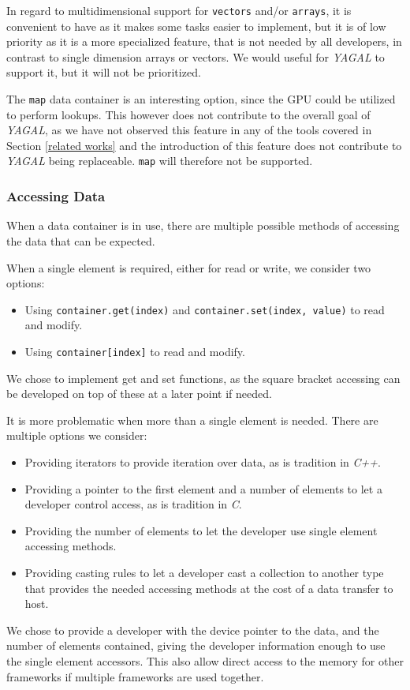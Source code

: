 In regard to multidimensional support for \texttt{vectors} and/or \texttt{arrays}, it is convenient to have as it makes some tasks easier to implement, but it is of low priority as it is a more specialized feature, that is not needed by all developers, in contrast to single dimension arrays or vectors. We would useful for \textit{YAGAL} to support it, but it will not be prioritized.

The \texttt{map} data container is an interesting option, since the GPU could be utilized to perform lookups. This however does not contribute to the overall goal of \textit{YAGAL}, as we have not observed this feature in any of the tools covered in Section \ref{related works} and the introduction of this feature does not contribute to \textit{YAGAL} being replaceable. \texttt{map} will therefore not be supported.

\subsubsection{Accessing Data}
When a data container is in use, there are multiple possible methods of accessing the data that can be expected. 

When a single element is required, either for read or write, we consider two options:
\begin{itemize}
\item Using \texttt{container.get(index)} and \texttt{container.set(index, value)} to read and modify.
\item Using \texttt{container[index]} to read and modify.
\end{itemize}
We chose to implement get and set functions, as the square bracket accessing can be developed on top of these at a later point if needed.

It is more problematic when more than a single element is needed. There are multiple options we consider:
\begin{itemize}
\item Providing iterators to provide iteration over data, as is tradition in \textit{C++}.
\item Providing a pointer to the first element and a number of elements to let a developer control access, as is tradition in \textit{C}.
\item Providing the number of elements to let the developer use single element accessing methods.
\item Providing casting rules to let a developer cast a collection to another type that provides the needed accessing methods at the cost of a data transfer to host.
\end{itemize}
We chose to provide a developer with the device pointer to the data, and the number of elements contained, giving the developer information enough to use the single element accessors. This also allow direct access to the memory for other frameworks if multiple frameworks are used together.

